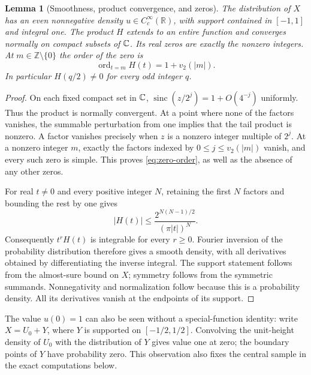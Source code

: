 \documentclass[11pt,a4paper]{article}
\numberwithin{equation}{section}
\newtheorem{lemma}[theorem]{Lemma}
\theoremstyle{definition}
\theoremstyle{remark}
\newcommand{\R}{\mathbb R}\newcommand{\Z}{\mathbb Z}\newcommand{\N}{\mathbb N}
\newcommand{\sinc}{\operatorname{sinc}}
\begin{document}
\begin{lemma}[Smoothness, product convergence, and zeros]
\label{lem:kernel}
The distribution of $X$ has an even nonnegative density
$u\in C_c^\infty(\R)$, with support contained in $[-1,1]$ and integral one.
The product $H$ extends to an entire function and converges normally on
compact subsets of $\mathbb C$. Its real zeros are exactly the nonzero integers.
At $m\in\Z\setminus\{0\}$ the order of the zero is
\begin{equation}
 \operatorname{ord}_{t=m}H(t)=1+v_2(|m|).
 \label{eq:zero-order}
\end{equation}
In particular $H(q/2)\ne0$ for every odd integer $q$.
\end{lemma}

\begin{proof}
On each fixed compact set in $\mathbb C$,
$\sinc(z/2^j)=1+O(4^{-j})$ uniformly. Thus the product is normally
convergent. At a point where none of the factors vanishes, the summable
perturbation from one implies that the tail product is nonzero. A factor
vanishes precisely when $z$ is a nonzero integer multiple of $2^j$.
At a nonzero integer $m$, exactly the factors indexed by
$0\le j\le v_2(|m|)$ vanish, and every such zero is simple. This proves
\eqref{eq:zero-order}, as well as the absence of any other zeros.

For real $t\ne0$ and every positive integer $N$, retaining the first $N$
factors and bounding the rest by one gives
\begin{equation}
 |H(t)|\le
 \frac{2^{N(N-1)/2}}{(\pi|t|)^N}.
 \label{eq:rough-decay}
\end{equation}
Consequently $t^rH(t)$ is integrable for every $r\ge0$. Fourier inversion
of the probability distribution therefore gives a smooth density, with
all derivatives obtained by differentiating the inverse integral. The
support statement follows from the almost-sure bound on $X$; symmetry
follows from the symmetric summands. Nonnegativity and normalization
follow because this is a probability density. All its derivatives vanish
at the endpoints of its support.
\end{proof}

The value $u(0)=1$ can also be seen without a special-function identity:
write $X=U_0+Y$, where $Y$ is supported on $[-1/2,1/2]$. Convolving the
unit-height density of $U_0$ with the distribution of $Y$ gives value one
at zero; the boundary points of $Y$ have probability zero. This observation
also fixes the central sample in the exact computations below.
\end{document}
